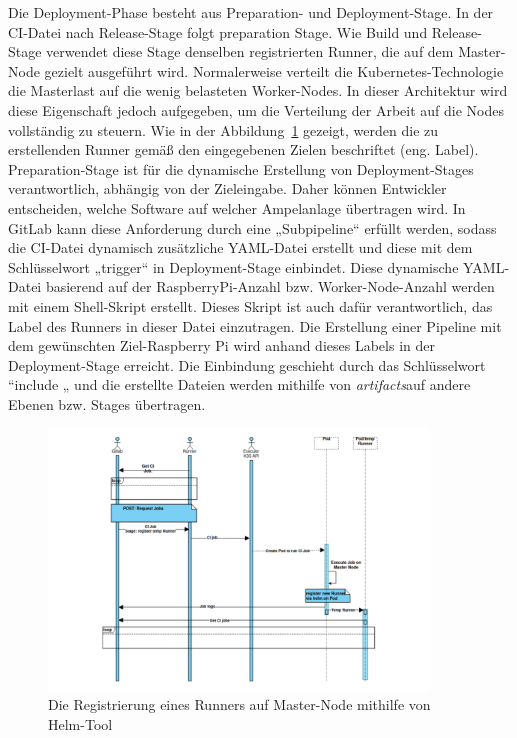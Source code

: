 Die Deployment-Phase besteht aus Preparation- und Deployment-Stage. In der CI-Datei nach Release-Stage folgt preparation Stage. Wie Build und Release-Stage verwendet diese Stage denselben registrierten Runner, die auf dem Master-Node gezielt ausgeführt wird. Normalerweise verteilt die Kubernetes-Technologie die Masterlast auf die wenig belasteten Worker-Nodes. In dieser Architektur wird diese Eigenschaft jedoch aufgegeben, um die Verteilung der Arbeit auf die Nodes vollständig zu steuern. Wie in der Abbildung~\ref{fig:rigister-temp-runner} gezeigt, werden die zu erstellenden Runner gemäß den eingegebenen Zielen beschriftet (eng. Label).
\newline\newline
Preparation-Stage ist für die dynamische Erstellung von Deployment-Stages verantwortlich, abhängig von der Zieleingabe. Daher können Entwickler entscheiden, welche Software auf welcher Ampelanlage übertragen wird. In GitLab kann diese Anforderung durch eine „Subpipeline“ erfüllt werden, sodass die CI-Datei dynamisch zusätzliche YAML-Datei erstellt und diese mit dem Schlüsselwort „trigger“ in Deployment-Stage einbindet. Diese dynamische YAML-Datei basierend auf der RaspberryPi-Anzahl bzw. Worker-Node-Anzahl werden mit einem Shell-Skript erstellt. Dieses Skript ist auch dafür verantwortlich, das Label des Runners in dieser Datei einzutragen. Die Erstellung einer Pipeline mit dem gewünschten Ziel-Raspberry Pi wird anhand dieses Labels in der Deployment-Stage erreicht. Die Einbindung geschieht durch das Schlüsselwort “include „ und die erstellte Dateien werden mithilfe von \glqq \textit{artifacts}\grqq auf andere Ebenen bzw. Stages übertragen.


\begin{figure}[bth] 
	\centering
	\includegraphics[width=0.9\textwidth]{Graphics/register-temp-runner.png}
	\caption{Die Registrierung eines Runners auf Master-Node mithilfe von Helm-Tool}
	\label{fig:rigister-temp-runner}
\end{figure}



